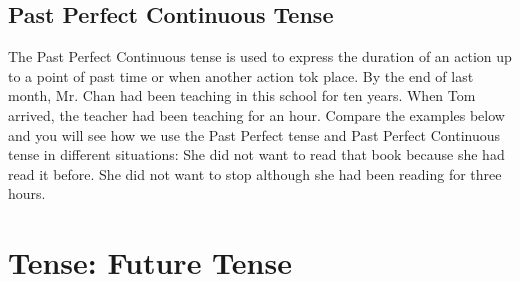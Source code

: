 \subsection{Past Perfect Continuous Tense}
The Past Perfect Continuous tense is used to express the duration of an action
up to a point of past time or when another action tok place.
\newline
By the end of last month, Mr. Chan had been teaching in this school for ten
years.
\newline
When Tom arrived, the teacher had been teaching for an hour.
\newline
\newline
Compare the examples below and you will see how we use the Past Perfect tense
and Past Perfect Continuous tense in different situations:
\newline
\newline
She did not want to read that book because she had read it before.
\newline
She did not want to stop although she had been reading for three hours.

\section{Tense: Future Tense}
